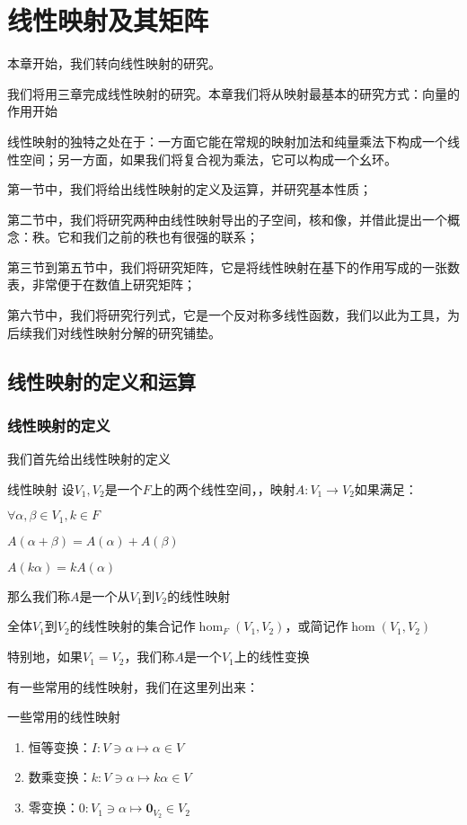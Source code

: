 \documentclass[12pt, a4paper, oneside, UTF8]{ctexbook}
\begin{document}
% 
\else
\fi
\chapter{线性映射及其矩阵}
	本章开始，我们转向线性映射的研究。

	我们将用三章完成线性映射的研究。本章我们将从映射最基本的研究方式：向量的作用开始

	线性映射的独特之处在于：一方面它能在常规的映射加法和纯量乘法下构成一个线性空间；另一方面，如果我们将复合视为乘法，它可以构成一个幺环。

	第一节中，我们将给出线性映射的定义及运算，并研究基本性质；
	
	第二节中，我们将研究两种由线性映射导出的子空间，核和像，并借此提出一个概念：秩。它和我们之前的秩也有很强的联系；

	第三节到第五节中，我们将研究矩阵，它是将线性映射在基下的作用写成的一张数表，非常便于在数值上研究矩阵；

	第六节中，我们将研究行列式，它是一个反对称多线性函数，我们以此为工具，为后续我们对线性映射分解的研究铺垫。
	\section{线性映射的定义和运算}
		\subsection{线性映射的定义}
			我们首先给出线性映射的定义
			\begin{defn}{线性映射}{}
				设$V_1,V_2$是一个$F$上的两个线性空间，，映射$A:V_1 \to V_2$如果满足：

				$\forall \alpha ,\beta \in V_1,k \in F$

				$A(\alpha+\beta )=A(\alpha )+A(\beta )$

				$A(k\alpha )=kA(\alpha )$

				那么我们称$A$是一个从$V_1$到$V_2$的线性映射

				全体$V_1$到$V_2$的线性映射的集合记作$\hom_F (V_1,V_2)$，或简记作$\hom (V_1,V_2)$

				特别地，如果$V_1=V_2$，我们称$A$是一个$V_1$上的线性变换
			\end{defn}
			有一些常用的线性映射，我们在这里列出来：
			\begin{defn}{一些常用的线性映射}{}
				\begin{enumerate}
					\item 恒等变换：$I:V \ni \alpha \mapsto \alpha \in V$
					\item 数乘变换：$k:V \ni \alpha \mapsto k\alpha \in V$
					\item 零变换：$0:V_1 \ni \alpha \mapsto \mathbf{0}_{V_2} \in V_2$
				\end{enumerate}
			\end{defn}
\end{document}
